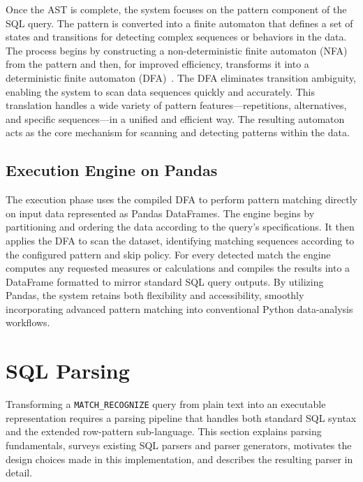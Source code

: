 Once the AST is complete, the system focuses on the pattern
component of the SQL query.  The pattern is converted into a finite
automaton that defines a set of states and transitions for detecting
complex sequences or behaviors in the data.  The process begins by
constructing a non-deterministic finite automaton (NFA) from the
pattern and then, for improved efficiency, transforms it into a
deterministic finite automaton
(DFA)~\cite{georgiou2025streaming}.  The DFA eliminates transition
ambiguity, enabling the system to scan data sequences quickly and
accurately.  This translation handles a wide variety of pattern
features---repetitions, alternatives, and specific sequences---in a
unified and efficient way.  The resulting automaton acts as the core
mechanism for scanning and detecting patterns within the data.

\subsection{Execution Engine on Pandas}
\label{subsec:overview-execution}

The execution phase uses the compiled DFA to perform pattern
matching directly on input data represented as Pandas DataFrames.
The engine begins by partitioning and ordering the data according to
the query's specifications.  It then applies the DFA to scan the
dataset, identifying matching sequences according to the configured
pattern and skip policy.
For every detected match the engine computes any requested measures
or calculations and compiles the results into a DataFrame formatted
to mirror standard SQL query outputs.  By utilizing Pandas, the
system retains both flexibility and accessibility, smoothly
incorporating advanced pattern matching into conventional Python
data-analysis workflows.

\section{SQL Parsing}
\label{sec:meth-compiler}

Transforming a \texttt{MATCH\_RECOGNIZE} query from plain text into
an executable representation requires a parsing pipeline that
handles both standard SQL syntax and the extended row-pattern
sub-language.  This section explains parsing fundamentals, surveys
existing SQL parsers and parser generators, motivates the design
choices made in this implementation, and describes the resulting
parser in detail.

